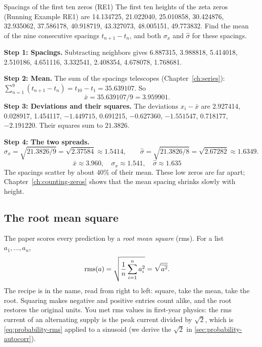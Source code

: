 \begin{sample}{Spacings of the first ten zeros (RE1)}
The first ten heights of the zeta zeros (Running Example RE1) are
14.134725, 21.022040, 25.010858, 30.424876, 32.935062, 37.586178, 40.918719, 43.327073, 48.005151, 49.773832. Find the mean of the nine consecutive spacings $t_{n+1}-t_n$, and both $\sigma_x$ and $\hat\sigma$ for these spacings.

\textbf{Step 1: Spacings.} Subtracting neighbors gives
6.887315, 3.988818, 5.414018, 2.510186, 4.651116, 3.332541, 2.408354, 4.678078, 1.768681.

\textbf{Step 2: Mean.} The sum of the spacings telescopes (Chapter~\ref{ch:series}): $\sum_{n=1}^{9}(t_{n+1}-t_n)=t_{10}-t_1=35.639107$. So
\[
\bar x = 35.639107/9 = 3.959901 .
\]
\textbf{Step 3: Deviations and their squares.} The deviations $x_i-\bar x$ are
2.927414, 0.028917, 1.454117, $-1.449715$, 0.691215, $-0.627360$, $-1.551547$, 0.718177, $-2.191220$. Their squares sum to $21.3826$.

\textbf{Step 4: The two spreads.}
\[
\sigma_x = \sqrt{21.3826/9}=\sqrt{2.37584}\approx1.5414,\qquad
\hat\sigma = \sqrt{21.3826/8}=\sqrt{2.67282}\approx 1.6349 .
\]
\[
\boxed{\bar x\approx3.960,\quad \sigma_x\approx1.541,\quad \hat\sigma\approx1.635}
\]
The spacings scatter by about 40\% of their mean. These low zeros are far apart; Chapter~\ref{ch:counting-zeros} shows that the mean spacing shrinks slowly with height.
\end{sample}

\subsection{The root mean square}

The paper scores every prediction by a \emph{root mean square} (rms). For a list $a_1,\dots,a_n$,
\begin{equation}
\mathrm{rms}(a) = \sqrt{\frac1n\sum_{i=1}^n a_i^2} = \sqrt{\overline{a^2}} .
\label{eq:probability-rms}
\end{equation}
The recipe is in the name, read from right to left: square, take the mean, take the root. Squaring makes negative and positive entries count alike, and the root restores the original units. You met rms values in first-year physics: the rms current of an alternating supply is the peak current divided by $\sqrt2$, which is \cref{eq:probability-rms} applied to a sinusoid (we derive the $\sqrt2$ in \cref{sec:probability-autocorr}).

